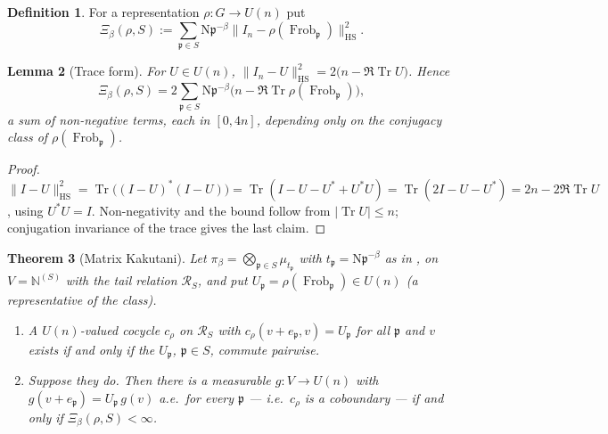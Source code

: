 \documentclass[11pt]{amsart}
\numberwithin{equation}{section}
\newtheorem{theorem}{Theorem}[section]
\newtheorem{lemma}[theorem]{Lemma}
\theoremstyle{definition}
\newtheorem{definition}[theorem]{Definition}
\theoremstyle{remark}
\newcommand{\N}{\mathbb{N}}
\newcommand{\cR}{\mathcal{R}}
\newcommand{\pp}{\mathfrak{p}}
\newcommand{\Ns}{\mathrm{N}}
\newcommand{\Frob}{\operatorname{Frob}}
\newcommand{\Tr}{\operatorname{Tr}}
\newcommand{\HS}{\mathrm{HS}}
\begin{document}
\begin{definition}\label{def:Xi}
For a representation $\rho:G\to U(n)$ put
\begin{equation}\label{eq:Xi}
\Xi_\beta(\rho,S):=\sum_{\pp\in S}\Ns\pp^{-\beta}\bigl\|I_n-\rho(\Frob_\pp)\bigr\|_{\HS}^2 .
\end{equation}
\end{definition}

\begin{lemma}[Trace form]\label{lem:trace}
For $U\in U(n)$, $\|I_n-U\|_{\HS}^2=2\bigl(n-\Re\Tr U\bigr)$. Hence
\begin{equation}\label{eq:trace}
\Xi_\beta(\rho,S)=2\sum_{\pp\in S}\Ns\pp^{-\beta}\bigl(n-\Re\Tr\rho(\Frob_\pp)\bigr),
\end{equation}
a sum of non-negative terms, each in $[0,4n]$, depending only on the conjugacy class of
$\rho(\Frob_\pp)$.
\end{lemma}

\begin{proof}
$\|I-U\|_{\HS}^2=\Tr\bigl((I-U)^*(I-U)\bigr)=\Tr(I-U-U^*+U^*U)=\Tr(2I-U-U^*)=2n-2\Re\Tr U$,
using $U^*U=I$. Non-negativity and the bound follow from $|\Tr U|\le n$; conjugation
invariance of the trace gives the last claim.
\end{proof}

\begin{theorem}[Matrix Kakutani]\label{thm:kakutani}
Let $\pi_\beta=\bigotimes_{\pp\in S}\mu_{t_\pp}$ with $t_\pp=\Ns\pp^{-\beta}$ as in
\cite[Lem.~2.10]{Main}, on $V=\N^{(S)}$ with the tail relation $\cR_S$, and put
$U_\pp=\rho(\Frob_\pp)\in U(n)$ (a representative of the class).
\begin{enumerate}
\item A $U(n)$-valued cocycle $c_\rho$ on $\cR_S$ with $c_\rho(v+e_\pp,v)=U_\pp$ for all
$\pp$ and $v$ exists if and only if the $U_\pp$, $\pp\in S$, commute pairwise.
\item Suppose they do. Then there is a measurable $g:V\to U(n)$ with
$g(v+e_\pp)=U_\pp\,g(v)$ a.e.\ for every $\pp$ --- i.e.\ $c_\rho$ is a coboundary --- if
and only if $\Xi_\beta(\rho,S)<\infty$.
\end{enumerate}
\end{theorem}
\end{document}
